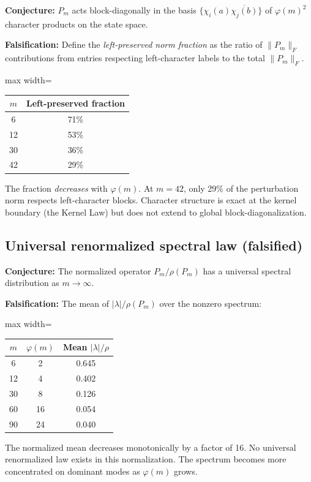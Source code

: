 \documentclass[11pt,a4paper]{article}
\begin{document}
\textbf{Conjecture:} $P_m$ acts block-diagonally in the basis $\{\chi_i(a) \overline{\chi_j(b)}\}$ of $\varphi(m)^2$ character products on the state space.

\textbf{Falsification:} Define the \emph{left-preserved norm fraction} as the ratio of $\|P_m\|_F$ contributions from entries respecting left-character labels to the total $\|P_m\|_F$.

\begin{center}
\begin{adjustbox}{max width=\linewidth}\begin{tabular}{cc}
\toprule
$m$ & Left-preserved fraction \\
\midrule
6 & 71\% \\
12 & 53\% \\
30 & 36\% \\
42 & 29\% \\
\bottomrule
\end{tabular}\end{adjustbox}
\end{center}
The fraction \emph{decreases} with $\varphi(m)$. At $m = 42$, only 29\% of the perturbation norm respects left-character blocks. Character structure is exact at the kernel boundary (the Kernel Law) but does not extend to global block-diagonalization.

\subsection{Universal renormalized spectral law (falsified)}

\textbf{Conjecture:} The normalized operator $P_m / \rho(P_m)$ has a universal spectral distribution as $m \to \infty$.

\textbf{Falsification:} The mean of $|\lambda|/\rho(P_m)$ over the nonzero spectrum:
\begin{center}
\begin{adjustbox}{max width=\linewidth}\begin{tabular}{ccc}
\toprule
$m$ & $\varphi(m)$ & Mean $|\lambda|/\rho$ \\
\midrule
6 & 2 & 0.645 \\
12 & 4 & 0.402 \\
30 & 8 & 0.126 \\
60 & 16 & 0.054 \\
90 & 24 & 0.040 \\
\bottomrule
\end{tabular}\end{adjustbox}
\end{center}
The normalized mean decreases monotonically by a factor of 16. No universal renormalized law exists in this normalization. The spectrum becomes more concentrated on dominant modes as $\varphi(m)$ grows.
\end{document}
